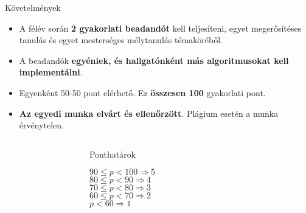 \documentclass[english, aspectratio=169]{beamer}
\begin{document}
	\begin{frame}{Követelmények}
		\begin{itemize}
			\item A félév során \textbf{2 gyakorlati beadandót} kell teljesíteni, egyet megerősítéses tanulás és egyet mesterséges mélytanulás témaköréből. 
			\item A beadandók \textbf{egyéniek, és hallgatónként más algoritmusokat kell implementálni}.
			\item Egyenként 50-50 pont elérhető. Ez \textbf{összesen 100} gyakorlati pont. 
			\item \textbf{Az egyedi munka elvárt és ellenőrzött}. Plágium esetén a munka érvénytelen. 
		\end{itemize}
		\par\smallskip
		\begin{columns}
			\begin{column}{.3\textwidth}
			\end{column}
			\begin{column}{.3\textwidth}
				\begin{block}{\begin{center}Ponthatárok\end{center}}
					\begin{center}
						$90 \leq p < 100 \Rightarrow 5$\\
						$80 \leq p < 90 \Rightarrow 4$\\
						$70 \leq p < 80 \Rightarrow 3$\\
						$60 \leq p < 70 \Rightarrow 2$\\
						$p < 60 \Rightarrow 1$
					\end{center}
				\end{block}
			\end{column}
			\begin{column}{.3\textwidth}
			\end{column}
		\end{columns}
	\end{frame}
	
\end{document}
